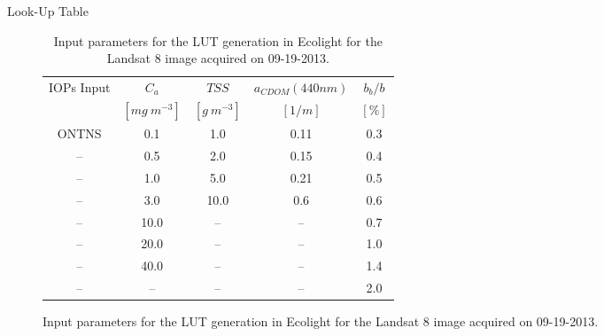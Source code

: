 \documentclass{beamer}
\begin{document}
\begin{frame}{}
\begin{columns}[t]
\begin{column}{.3\linewidth}
\end{column}
 \begin{column}{.3\linewidth}
\begin{block}{Look-Up Table}

\begin{figure}[htb]
  \begin{minipage}[c]{0.44\linewidth}
\begin{table}[htb]
\caption{Input parameters for the LUT generation in Ecolight for the Landsat 8 image acquired on 09-19-2013. \label{tab:LUTconc2}} 
\scriptsize
\centering
    \begin{tabular}{c|c|c|c|c}
    \hline \hline
            IOPs Input & \bfseries{$C_a$} & \bfseries{$TSS$} & \bfseries{$a_{CDOM}(440nm)$} & \bfseries{$b_b/b$}    \\
                   & $[mg~m^{-3}]$        & $[g~m^{-3}]$       &  $[1/m]$           & $[\%]$            \\ \hline \hline
ONTNS   &  0.1    & 1.0     &  0.11   &  0.3  \\
--    &  0.5    & 2.0     &  0.15   &  0.4  \\
--      &  1.0    & 5.0     &  0.21   &  0.5  \\
--      &  3.0    & 10.0    &  0.6    &  0.6  \\ 
--    &  10.0     & --    &  --   &  0.7  \\  
--      &  20.0     & --    &  --   &  1.0  \\  
--      &  40.0     & --    &  --   &  1.4  \\
--      &  --       & --    &  --   &  2.0  \\ \hline


\end{tabular}
\end{table}
\end{minipage}
\end{figure}
\end{block}
\end{column}
\end{columns}
\end{frame}
\end{document}
